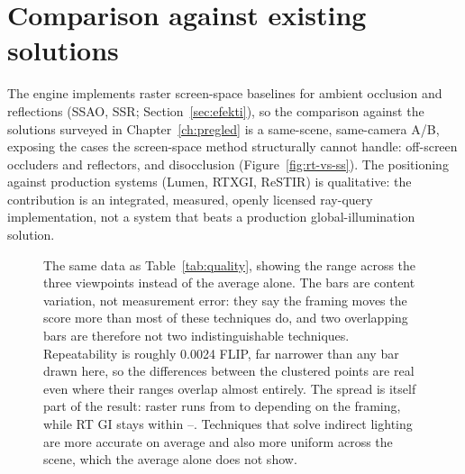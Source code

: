 \section{Comparison against existing solutions}
\label{sec:poredjenje}

The engine implements raster screen-space baselines for ambient occlusion and reflections (SSAO, SSR;
Section~\ref{sec:efekti}), so the comparison against the solutions surveyed in
Chapter~\ref{ch:pregled} is a same-scene, same-camera A/B, exposing the cases the screen-space method
structurally cannot handle: off-screen occluders and reflectors, and disocclusion
(Figure~\ref{fig:rt-vs-ss}). The positioning against production systems (Lumen, RTXGI, ReSTIR) is
qualitative: the contribution is an integrated, measured, openly licensed ray-query implementation,
not a system that beats a production global-illumination solution.

\begin{table}[tbp]
\caption[Quality of each technique against the reference]{Each technique's quality against the path-traced reference (averaged over three viewpoints:
atrium, floor, gallery; RX 9070 XT). Lower FLIP and higher PSNR/SSIM are better.}
\label{tab:quality}
\centering

\end{table}

\begin{figure}[tbp]
\centering
{}
\caption[FLIP per technique with the spread across viewpoints]{The same data as
Table~\ref{tab:quality}, showing the range across the three viewpoints instead of the average alone.
The bars are content variation, not measurement error: they say the framing moves the score more than
most of these techniques do, and two overlapping bars are therefore not two indistinguishable
techniques. Repeatability is roughly 0.0024 FLIP, far narrower than any bar drawn here, so the
differences between the clustered points are real even where their ranges overlap almost entirely.
The spread is itself part of the result: raster runs from \qRasterFlipLo{} to \qRasterFlipHi{}
depending on the framing, while RT GI stays within \qRtGiFlipLo{}--\qRtGiFlipHi{}. Techniques that
solve indirect lighting are more accurate on average and also more uniform across the scene, which
the average alone does not show.}
\label{fig:quality-spread}
\end{figure}

